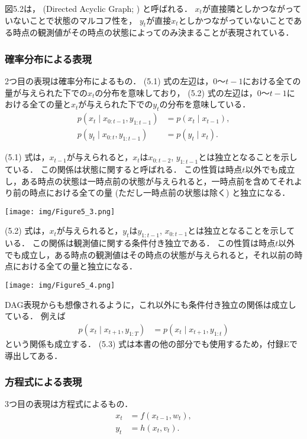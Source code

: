 \documentclass[11pt,a4paper]{jsarticle}
\numberwithin{equation}{section}
\begin{document}
図5.2は， (Directed Acyclic Graph; ) と呼ばれる．
$x_t$が直接隣としかつながっていないことで状態のマルコフ性を，
$y_t$が直接$x_t$としかつながっていないことである時点の観測値がその時点の状態によってのみ決まることが表現されている．

\subsubsection{確率分布による表現}
2つ目の表現は確率分布によるもの．
(5.1) 式の左辺は，$0$～$t − 1$における全ての量が与えられた下での$x_t$の分布を意味しており，
(5.2) 式の左辺は，$0$～$t − 1$における全ての量と$x_t$が与えられた下での$y_t$の分布を意味している．
\begin{align}
p(x_t \mid x_{0:t-1}, y_{1:t-1})
& =
p(x_t \mid x_{t-1}), \\
p(y_t \mid x_{0:t}, y_{1:t-1})
& =
p(y_t \mid x_t).
\end{align}

(5.1) 式は，$x_{t−1}$が与えられると，$x_t$は$x_{0:t−2}$, $y_{1:t−1}$とは独立となることを示している．
この関係は状態に関すると呼ばれる．
この性質は時点$t$以外でも成立し，ある時点の状態は一時点前の状態が与えられると，一時点前を含めてそれより前の時点における全ての量 (ただし一時点前の状態は除く) と独立になる．
\begin{center}
\texttt{[image: img/Figure5\_3.png]}
\end{center}

(5.2) 式は，$x_t$が与えられると，$y_t$は$y_{1:t−1}$, $x_{0:t−1}$とは独立となることを示している．
この関係は観測値に関する条件付き独立である．
この性質は時点$t$以外でも成立し，ある時点の観測値はその時点の状態が与えられると，それ以前の時点における全ての量と独立になる．
\begin{center}
\texttt{[image: img/Figure5\_4.png]}
\end{center}

DAG表現からも想像されるように，これ以外にも条件付き独立の関係は成立している．
例えば
\begin{align}
p(x_t \mid x_{t+1}, y_{1:T}) 
& =
p(x_t \mid x_{t+1}, y_{1:t})
\end{align}
という関係も成立する．
(5.3) 式は本書の他の部分でも使用するため，付録Eで導出してある．

\subsubsection{方程式による表現}
3つ目の表現は方程式によるもの．
\begin{align}
x_t
& =
f(x_{t-1}, w_t), \\
y_t
& =
h(x_t, v_t).
\end{align}
\end{document}
